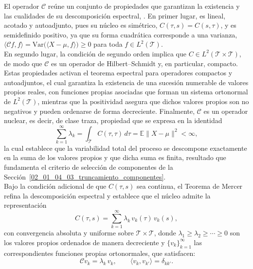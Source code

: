El operador $\mathcal{C}$ reúne un conjunto de propiedades que garantizan la existencia y las cualidades de su descomposición espectral, \cite{02_02_hsing2015theoretical}. En primer lugar, es lineal, acotado y autoadjunto, pues su núcleo es simétrico, $C(\tau,s) = C(s,\tau)$, y es semidefinido positivo, ya que su forma cuadrática corresponde a una varianza, $\langle \mathcal{C}f, f\rangle = \mathrm{Var}\bigl(\langle X - \mu, f\rangle\bigr) \geq 0$ para toda $f \in L^2(\mathcal{T})$.\\

En segundo lugar, la condición de segundo orden implica que $C \in L^2(\mathcal{T}\times\mathcal{T})$, de modo que $\mathcal{C}$ es un operador de Hilbert--Schmidt y, en particular, compacto. Estas propiedades activan el teorema espectral para operadores compactos y autoadjuntos, el cual garantiza la existencia de una sucesión numerable de valores propios reales, con funciones propias asociadas que forman un sistema ortonormal de $L^2(\mathcal{T})$, mientras que la positividad asegura que dichos valores propios son no negativos y pueden ordenarse de forma decreciente. Finalmente, $\mathcal{C}$ es un operador nuclear, es decir, de clase traza, propiedad que se expresa en la identidad
\begin{equation}\label{eq:traza}
    \sum_{k=1}^{\infty} \lambda_k
    = \int_{\mathcal{T}} C(\tau, \tau)\, d\tau
    = \mathbb{E}\|X - \mu\|^2 < \infty,
\end{equation}
la cual establece que la variabilidad total del proceso se descompone exactamente en la suma de los valores propios y que dicha suma es finita, resultado que fundamenta el criterio de selección de componentes de la Sección~\ref{02_01_04_03_truncamiento_componentes}.\\

Bajo la condición adicional de que $C(\tau, s)$ sea continua, el Teorema de Mercer \cite{02_01_mercer1909functions} refina la descomposición espectral y establece que el núcleo admite la representación
\begin{equation}\label{eq:mercer}
    C(\tau, s) = \sum_{k=1}^{\infty} \lambda_k\, v_k(\tau)\, v_k(s),
\end{equation}
con convergencia absoluta y uniforme sobre $\mathcal{T}\times\mathcal{T}$, donde $\lambda_1 \geq \lambda_2 \geq \cdots \geq 0$ son los valores propios ordenados de manera decreciente y $\{v_k\}_{k=1}^{\infty}$ las correspondientes funciones propias ortonormales, que satisfacen:
\begin{equation}
    \mathcal{C}v_k = \lambda_k\, v_k,
    \qquad \langle v_k, v_{k'} \rangle = \delta_{kk'}.
\end{equation}

